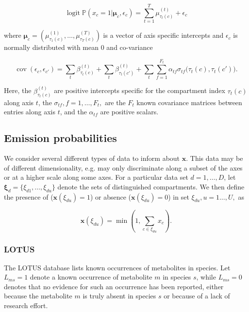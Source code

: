 \documentclass[a4paper,10pt]{article}
\DeclareMathOperator{\logit}{logit}
\DeclareMathOperator{\cov}{cov}
\def\P{\mathbb{P}}
\def\x{\boldsymbol{x}}
\def\bmu{\boldsymbol{\mu}}
\def\bxi{\boldsymbol{\xi}}
\begin{document}
\begin{equation}
	\logit \P(x_c=1|\bmu_c, \epsilon_c) = \sum_{t=1}^{T} \mu^{(t)}_{\tau_t(c)} + \epsilon_{c}
\end{equation}

where $\bmu_c=(\mu^{(1)}_{\tau_1(c)}, \ldots, \mu^{(T)}_{\tau_T(c)})$ is a vector of axis specific intercepts and $\epsilon_{c}$ is normally distributed with mean 0 and co-variance

\begin{equation}
	\cov(\epsilon_c, \epsilon_{c'}) = \sum_t \beta^{(t)}_{\tau_t(c)} + \sum_t \beta^{(t)}_{\tau_t(c')} + \sum_t \sum_{f=1}^{F_t} \alpha_{tf} \sigma_{tf}\Big(\tau_t(c), \tau_t(c')\Big).
\end{equation}



Here, the $\beta^{(t)}_{\tau_t(c)}$ are positive intercepts specific for the compartment index $\tau_t(c)$ along axis $t$, the $\sigma_{tf}, f=1, \ldots, F_t,$ are the $F_t$ known covariance matrices between entries along axis $t$, and the $\alpha_{tf}$ are positive scalars.

\subsection{Emission probabilities}

We consider several different types of data to inform about $\x$. This data may be of different dimensionality, e.g. may only discriminate along a subset of the axes or at a higher scale along some axes. For a particular data set $d=1, \ldots, D$, let $\bxi_d=\{\xi_{d1}, \ldots, \xi_{du}\}$ denote the sets of distinguished compartments. We then define the presence of ($\x(\xi_{du})=1$) or absence ($\x(\xi_{du})=0$) in set $\xi_{du}, u=1\ldots,U,$ as

\begin{equation*}
 \x(\xi_{du}) = \min \left(1, \sum_{c \in \xi_{du}} x_c \right).
\end{equation*}


\subsubsection{LOTUS}

 The LOTUS database \cite{rutzLOTUSInitiativeOpen2022} lists known occurrences of metabolites in species. Let $L_{ms} = 1$ denote a known occurrence of metabolite $m$ in species $s$, while $L_{ms}=0$ denotes that no evidence for such an occurrence has been reported, either because the metabolite $m$ is truly absent in species $s$ or because of a lack of research effort.
\end{document}

